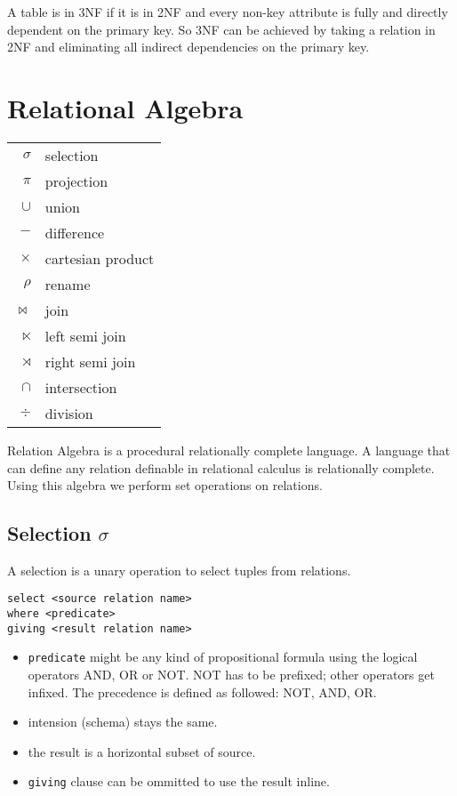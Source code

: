 \documentclass[a4paper,twocolumn]{article}
\begin{document}
A table is in 3NF if it is in 2NF and every non-key attribute is fully and
directly dependent on the primary key. So 3NF can be achieved by taking a
relation in 2NF and eliminating all indirect dependencies on the primary
key.

\section{Relational Algebra}
%
\begin{table}[h]
  \begin{center}
    \begin{tabular}{rl}
      $\sigma$ & selection \\
      $\pi$    & projection \\
      $\cup$   & union \\
      $-$      & difference \\
      $\times$ & cartesian product \\
      $\rho$   & rename \\
      $\bowtie$& join \\
      $\ltimes$& left semi join \\
      $\rtimes$& right semi join \\
      $\cap$   & intersection \\
      $\div$   & division \\
    \end{tabular}
  \end{center}
\end{table}
%
Relation Algebra is a procedural relationally complete language.
A language that can define any relation definable in relational calculus
is relationally complete. Using this algebra we perform set operations
on relations.

\subsection{Selection $\sigma$}

A selection is a unary operation to select tuples from relations.

\begin{verbatim}
select <source relation name>
where <predicate>
giving <result relation name>
\end{verbatim}

\begin{itemize}
  \item \texttt{predicate} might be any kind of propositional formula
        using the logical operators AND, OR or NOT. NOT has to be prefixed;
        other operators get infixed.
        The precedence is defined as followed: NOT, AND, OR.
  \item intension (schema) stays the same.
  \item the result is a horizontal subset of source.
  \item \texttt{giving} clause can be ommitted to use the result inline.
\end{itemize}
\end{document}
